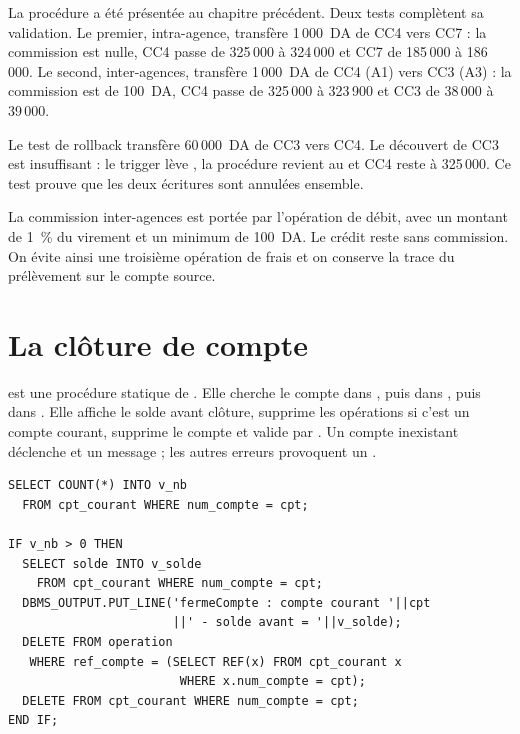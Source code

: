 La procédure  a été présentée au chapitre précédent. Deux tests
complètent sa validation. Le premier, intra-agence, transfère 1\,000~DA de CC4
vers CC7 : la commission est nulle, CC4 passe de 325\,000 à 324\,000 et CC7 de
185\,000 à 186\,000. Le second, inter-agences, transfère 1\,000~DA de CC4 (A1)
vers CC3 (A3) : la commission est de 100~DA, CC4 passe de 325\,000 à 323\,900
et CC3 de 38\,000 à 39\,000.

Le test de rollback transfère 60\,000~DA de CC3 vers CC4. Le découvert de CC3
est insuffisant : le trigger lève , la procédure revient au
 et CC4 reste à 325\,000. Ce test prouve que les deux écritures
sont annulées ensemble.

\begin{remarquebox}
La commission inter-agences est portée par l'opération de débit, avec un
montant de 1~\% du virement et un minimum de 100~DA. Le crédit reste sans
commission. On évite ainsi une troisième opération de frais et on conserve la
trace du prélèvement sur le compte source.
\end{remarquebox}

\section{La clôture de compte}

 est une procédure statique de . Elle
cherche le compte dans , puis dans , puis
dans . Elle affiche le solde avant clôture, supprime les
opérations si c'est un compte courant, supprime le compte et valide par
. Un compte inexistant déclenche  et un
message ; les autres erreurs provoquent un .

\begin{lstlisting}[caption={Clôture d'un compte courant et suppression de ses opérations.},label={lst:ferme-compte}]
SELECT COUNT(*) INTO v_nb
  FROM cpt_courant WHERE num_compte = cpt;

IF v_nb > 0 THEN
  SELECT solde INTO v_solde
    FROM cpt_courant WHERE num_compte = cpt;
  DBMS_OUTPUT.PUT_LINE('fermeCompte : compte courant '||cpt
                       ||' - solde avant = '||v_solde);
  DELETE FROM operation
   WHERE ref_compte = (SELECT REF(x) FROM cpt_courant x
                        WHERE x.num_compte = cpt);
  DELETE FROM cpt_courant WHERE num_compte = cpt;
END IF;
\end{lstlisting}

